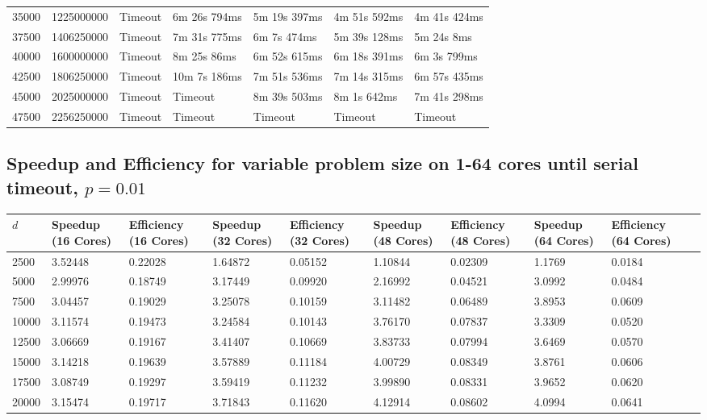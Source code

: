 \documentclass[12pt]{article}
\begin{document}
\begin{appendices}
{\begin{center}
\begin{tabular}{|p{1cm}|p{2cm}|p{2.2cm}|p{2.2cm}|p{2.2cm}|p{2.2cm}|p{2.2cm}|}
35000 & 1225000000 & Timeout &	6m 26s 794ms & 	5m 19s 397ms & 	4m 51s 592ms & 	4m 41s 424ms \\ 
37500 & 1406250000 & Timeout &	7m 31s 775ms & 	6m 7s 474ms & 	5m 39s 128ms & 	5m 24s 8ms  \\ 
40000 & 1600000000 & Timeout &	8m 25s 86ms & 	6m 52s 615ms & 	6m 18s 391ms & 	6m 3s 799ms  \\ 
42500 & 1806250000 & Timeout &	10m 7s 186ms & 	7m 51s 536ms & 	7m 14s 315ms & 	6m 57s 435ms  \\ 
45000 & 2025000000 & Timeout &	Timeout &	8m 39s 503ms & 	8m 1s 642ms & 	7m 41s 298ms \\
47500 & 2256250000 & Timeout &	Timeout &	Timeout &	Timeout &	Timeout \\
\hline
\end{tabular}
\end{center}}

\clearpage
\subsection{Speedup and Efficiency for variable problem size on 1-64 cores until serial timeout, $p=0.01$}\vspace{-0.5cm}
\footnotesize{\label{sec:varprob}
\begin{center}
\begin{tabular}{|p{0.8cm}|p{1.6cm}|p{1.6cm}|p{1.6cm}|p{1.6cm}|p{1.6cm}|p{1.6cm}|p{1.6cm}|p{1.6cm}|p{1.6cm}|}
\hline
$d$ & Speedup (16 Cores) & Efficiency (16 Cores) & Speedup (32 Cores) & Efficiency (32 Cores) & Speedup (48 Cores) & Efficiency (48 Cores) & Speedup (64 Cores) & Efficiency (64 Cores) \\
\hline
2500 & 3.52448 & 0.22028 & 1.64872 & 0.05152 & 1.10844 & 0.02309 & 1.1769 & 0.0184 \\
5000 & 2.99976 & 0.18749 & 3.17449 & 0.09920 & 2.16992 & 0.04521 & 3.0992 & 0.0484 \\
7500 & 3.04457 & 0.19029 & 3.25078 & 0.10159 & 3.11482 & 0.06489 & 3.8953 & 0.0609 \\
10000 & 3.11574 & 0.19473 & 3.24584 & 0.10143 & 3.76170 & 0.07837 & 3.3309 & 0.0520 \\
12500 & 3.06669 & 0.19167 & 3.41407 & 0.10669 & 3.83733 & 0.07994 & 3.6469 & 0.0570 \\
15000 & 3.14218 & 0.19639 & 3.57889 & 0.11184 & 4.00729 & 0.08349 & 3.8761 & 0.0606 \\
17500 & 3.08749 & 0.19297 & 3.59419 & 0.11232 & 3.99890 & 0.08331 & 3.9652 & 0.0620 \\
20000 & 3.15474 & 0.19717 & 3.71843 & 0.11620 & 4.12914 & 0.08602 & 4.0994 & 0.0641 \\
\hline
\end{tabular}
\end{center}}


\end{appendices}
\end{document}
